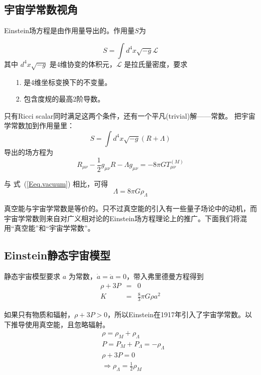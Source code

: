 \documentclass[12pt]{ctexart}
\newcommand{\refeq}[1]{式~(\ref{#1})}
\begin{document}
\subsection{宇宙学常数视角}
Einstein场方程是由作用量导出的。作用量$S$为

\begin{equation}
    S = \int d^4 x \sqrt{-g} \mathcal{L} 
\end{equation}
其中 $d^4 x \sqrt{-g}$ 是4维协变的体积元，$\mathcal{L}$ 是拉氏量密度，要求 
\begin{itemize}
    \item[1.] 是4维坐标变换下的不变量。
    \item[2.] 包含度规的最高2阶导数。
\end{itemize}

只有Ricci scalar同时满足这两个条件，还有一个平凡(trivial)解——常数。 把宇宙学常数加到作用量里：
\begin{equation}
    S = \int d^4 x \sqrt{-g} \left( R  + \Lambda \right) 
\end{equation}
导出的场方程为
\begin{equation}
    R_{\mu\nu} - \frac{1}{2} g_{\mu\nu} R - \Lambda g_{\mu\nu} =  -8\pi G T_{\mu\nu}^{(M)} 
\end{equation}

与 \refeq{Eeq.vacuum} 相比，可得
\begin{equation}
    \Lambda = 8\pi G \rho_\Lambda 
\end{equation}

真空能与宇宙学常数是等价的。只不过真空能的引入有一些量子场论中的动机，而宇宙学常数则来自对广义相对论的Einstein场方程理论上的推广。下面我们将混用“真空能”和“宇宙学常数”。

\subsection{Einstein静态宇宙模型}

静态宇宙模型要求 $a$ 为常数，$\dot{a}=\ddot{a}=0$，带入弗里德曼方程得到
\begin{eqnarray}
    \rho+3P&=&0 \\
    K &=& \frac{8}{3} \pi G \rho a^2
\end{eqnarray}

如果只有物质和辐射，$\rho+3P>0$，所以Einstein在1917年引入了宇宙学常数。以下推导使用真空能，且忽略辐射。
\begin{equation}
    \begin{aligned}
    &\rho=\rho_{M}+\rho_{\Lambda}\\
    &P=P_{M}+P_{\Lambda}=-\rho_{\Lambda}\\
    &\rho+3 P = 0 \\
    & \Rightarrow \rho_{\Lambda}=\frac{1}{2} \rho_{M}
    \end{aligned}
\end{equation}
\end{document}
